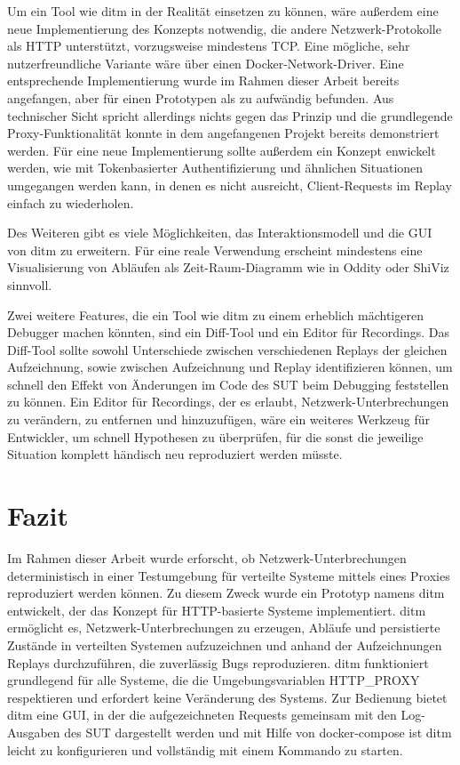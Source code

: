 \documentclass[12pt,a4paper]{report}
\begin{document}
Um ein Tool wie ditm in der Realität einsetzen zu können, wäre außerdem eine neue Implementierung des Konzepts notwendig, die
andere Netzwerk-Protokolle als HTTP unterstützt, vorzugsweise mindestens TCP. Eine mögliche, sehr nutzerfreundliche Variante wäre
über einen Docker-Network-Driver. Eine entsprechende Implementierung wurde im Rahmen dieser Arbeit bereits angefangen, aber für
einen Prototypen als zu aufwändig befunden. Aus technischer Sicht spricht allerdings nichts gegen das Prinzip und die grundlegende
Proxy-Funktionalität konnte in dem angefangenen Projekt bereits demonstriert werden. Für eine neue Implementierung sollte außerdem
ein Konzept enwickelt werden, wie mit Tokenbasierter Authentifizierung und ähnlichen Situationen umgegangen werden kann, in denen
es nicht ausreicht, Client-Requests im Replay einfach zu wiederholen.

Des Weiteren gibt es viele Möglichkeiten, das Interaktionsmodell und die GUI von ditm zu erweitern. Für eine reale Verwendung
erscheint mindestens eine Visualisierung von Abläufen als Zeit-Raum-Diagramm wie in Oddity \cite{oddity_graphical_debugger} oder
ShiViz \cite{ShiViz_visual_debugger} sinnvoll.

Zwei weitere Features, die ein Tool wie ditm zu einem erheblich mächtigeren Debugger machen könnten, sind ein Diff-Tool und ein
Editor für Recordings. Das Diff-Tool sollte sowohl Unterschiede zwischen verschiedenen Replays der gleichen Aufzeichnung, sowie
zwischen Aufzeichnung und Replay identifizieren können, um schnell den Effekt von Änderungen im Code des SUT beim Debugging
feststellen zu können. Ein Editor für Recordings, der es erlaubt, Netzwerk-Unterbrechungen zu verändern, zu entfernen und
hinzuzufügen, wäre ein weiteres Werkzeug für Entwickler, um schnell Hypothesen zu überprüfen, für die sonst die jeweilige
Situation komplett händisch neu reproduziert werden müsste.



\chapter{Fazit}
Im Rahmen dieser Arbeit wurde erforscht, ob Netzwerk-Unterbrechungen deterministisch in einer Testumgebung für verteilte Systeme
mittels eines Proxies reproduziert werden können. Zu diesem Zweck wurde ein Prototyp namens ditm entwickelt, der das Konzept für
HTTP-basierte Systeme implementiert. ditm ermöglicht es, Netzwerk-Unterbrechungen zu erzeugen, Abläufe und persistierte Zustände
in verteilten Systemen aufzuzeichnen und anhand der Aufzeichnungen Replays durchzuführen, die zuverlässig Bugs reproduzieren. ditm
funktioniert grundlegend für alle Systeme, die die Umgebungsvariablen HTTP\_PROXY respektieren und erfordert keine Veränderung des
Systems. Zur Bedienung bietet ditm eine GUI, in der die aufgezeichneten Requests gemeinsam mit den Log-Ausgaben des SUT
dargestellt werden und mit Hilfe von docker-compose ist ditm leicht zu konfigurieren und vollständig mit einem Kommando zu starten.
\end{document}
